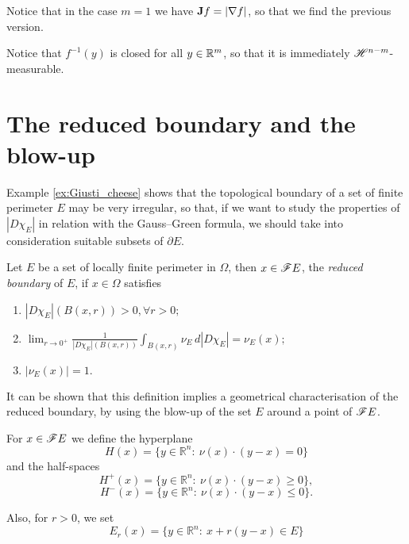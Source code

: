 Notice that in the case $m = 1$ we have ${\bf J} f = |\nabla f|$, so that we find the previous version.

\begin{remark}
Notice that $f^{-1}(y)$ is closed for all $y \in \mathbb{R}^{m}$, so that it is immediately $\mathscr{H}^{n - m}$-measurable.
\end{remark}





\section{The reduced boundary and the blow-up}

Example \ref{ex:Giusti_cheese} shows that the topological boundary of a set of finite perimeter $E$ may be very irregular, so that, if we want to study the properties of $|D\chi_E|$ in relation with the Gauss--Green formula, we should take into consideration suitable subsets of $\partial E$.

\begin{definition} \label{reducedboundary} Let $E$ be a set of locally finite perimeter in $\Omega$, then $x \in \mathscr{F} E$, the {\em reduced boundary} of $E$, if $x \in \Omega$ satisfies
\begin{enumerate}
	\item $|D\chi_{E}|(B(x,r)) > 0, \forall r >0;$
	\item $\displaystyle \lim_{r \to 0^{+}} \frac{1}{|D\chi_{E}|(B(x,r))} \int_{B(x,r)} \nu_{E} \, d|D\chi_{E}| = \nu_{E} (x);$
	\item $|\nu_{E}(x)| = 1.$
\end{enumerate}
\end{definition}

It can be shown that this definition implies a geometrical characterisation of the reduced boundary, by using the blow-up of the set $E$ around a point of $\mathscr{F} E$.

\begin{definition} For $x \in \mathscr{F} E$ we define the hyperplane
\[H(x) = \{ y \in \mathbb{R}^{n} : \ \nu(x) \cdot (y - x) = 0 \} \]
and the half-spaces
\[H^{+}(x) = \{ y \in \mathbb{R}^{n} : \ \nu(x) \cdot (y - x) \ge 0 \}, \]
\[H^{-}(x) = \{ y \in \mathbb{R}^{n} : \ \nu(x) \cdot (y - x) \le 0 \}. \]

Also, for $r > 0$, we set
\[ E_{r} (x) = \{ y \in \mathbb{R}^{n} : \ x + r(y - x) \in E \} \]
\end{definition}

